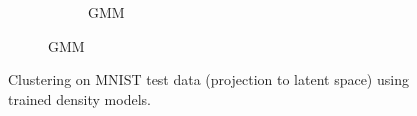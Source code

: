 \begin{figure}
\begin{floatrow}
{\begin{subfigure}[t]{0.45\textwidth}
\begin{subfigure}[t]{0.49\textwidth}
			\caption{GMM}
			\label{fig:gmm:clustering}
		\end{subfigure}
	\end{subfigure}
	}{%
	\caption{Clustering on MNIST test data (projection to latent space) using trained density models.}
	}
\end{floatrow}
\end{figure}